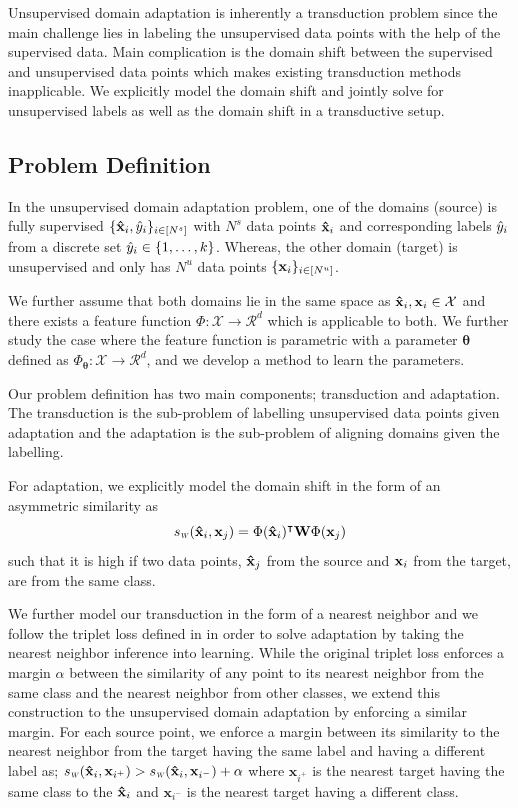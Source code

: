 Unsupervised domain adaptation is inherently a transduction problem since the main challenge lies in labeling the unsupervised data points with the help of the supervised data. Main complication is the domain shift between the supervised and unsupervised data points which makes existing transduction methods inapplicable. We explicitly model the domain shift and jointly solve for unsupervised labels as well as the domain shift in a transductive setup.

\subsection{Problem Definition}
In the unsupervised domain adaptation problem, one of the domains (source) is fully supervised $\{\mathbf{\hat{x}}_i, \hat{y}_i \}_{i \in [N^s]}$ with $N^s$ data points $\mathbf{\hat{x}}_i$ and corresponding labels $\hat{y}_i$ from a discrete set $\hat{y}_i \in \{1,\ldots, k \}$. Whereas, the other domain (target) is unsupervised and only has $N^u$ data points $\{\mathbf{x}_i \}_{i \in [N^u]}$. 

We further assume that both domains lie in the same space as $\mathbf{\hat{x}}_i,\mathbf{x}_i \in \mathcal{X}$ and there exists a feature function \mbox{$\Phi:\mathcal{X}\rightarrow \mathcal{R}^d$} which is applicable to both. We further study the case where the feature function is parametric with a parameter $\mathbf{\theta}$ defined as \mbox{$\Phi_\mathbf{\theta}:\mathcal{X}\rightarrow \mathcal{R}^d$}, and we develop a method to learn the parameters.

Our problem definition has two main components; transduction and adaptation. The transduction is the sub-problem of labelling unsupervised data points given adaptation and the adaptation is the sub-problem of aligning domains given the labelling. 

For adaptation, we explicitly model the domain shift in the form of an asymmetric similarity as
\begin{equation}
\sw(\xsi,\xuj) = \Phi(\xsi)^\intercal \mathbf{W} \Phi(\xuj)
\end{equation}
such that it is high if two data points, $\mathbf{\hat{x}}_j$ from the source and $\mathbf{x}_i$ from the target, are from the same class.

We further model our transduction in the form of a nearest neighbor and we follow the triplet loss defined in \cite{lmnn} in order to solve adaptation by taking the nearest neighbor inference into learning. While the original triplet loss \cite{lmnn} enforces a margin $\alpha$ between the similarity of any point to its nearest neighbor from the same class and the nearest neighbor from other classes, we extend this construction to the unsupervised domain adaptation by enforcing a similar margin. For each source point, we enforce a margin between its similarity to the nearest neighbor from the target having the same label and having a different label as; $ \sw(\xsi,\mathbf{x}_{i^+}) > \sw(\xsi,\mathbf{x}_{i^-}) + \alpha$ where $\mathbf{x}_{i^+}$ is the nearest target having the same class to the $\mathbf{\hat{x}}_i$ and $\mathbf{x}_{i^-}$ is the nearest target having a different class.

